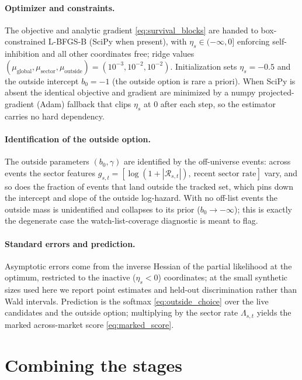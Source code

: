 \documentclass[11pt]{article}
\theoremstyle{plain}
\theoremstyle{definition}
\theoremstyle{remark}
\newcommand{\cR}{\mathcal{R}}
\begin{document}
\paragraph{Optimizer and constraints.}
The objective and analytic gradient \eqref{eq:survival_blocks} are handed to box-constrained L-BFGS-B (SciPy when present), with $\eta_s\in(-\infty,0]$ enforcing self-inhibition and all other coordinates free; ridge values $(\mu_{\text{global}},\mu_{\text{sector}},\mu_{\text{outside}})=(10^{-3},10^{-2},10^{-2})$. Initialization sets $\eta_s=-0.5$ and the outside intercept $b_0=-1$ (the outside option is rare a priori). When SciPy is absent the identical objective and gradient are minimized by a numpy projected-gradient (Adam) fallback that clips $\eta_s$ at $0$ after each step, so the estimator carries no hard dependency.

\paragraph{Identification of the outside option.}
The outside parameters $(b_0,\gamma)$ are identified by the off-universe events: across events the sector features $g_{s,t}=[\log(1+|\cR_{s,t}|),\ \text{recent sector rate}]$ vary, and so does the fraction of events that land outside the tracked set, which pins down the intercept and slope of the outside log-hazard. With no off-list events the outside mass is unidentified and collapses to its prior ($b_0\to-\infty$); this is exactly the degenerate case the watch-list-coverage diagnostic is meant to flag.

\paragraph{Standard errors and prediction.}
Asymptotic errors come from the inverse Hessian of the partial likelihood at the optimum, restricted to the inactive ($\eta_s<0$) coordinates; at the small synthetic sizes used here we report point estimates and held-out discrimination rather than Wald intervals. Prediction is the softmax \eqref{eq:outside_choice} over the live candidates and the outside option; multiplying by the sector rate $\Lambda_{s,t}$ yields the marked across-market score \eqref{eq:marked_score}.

\section{Combining the stages}
\label{sec:combine}
\end{document}
